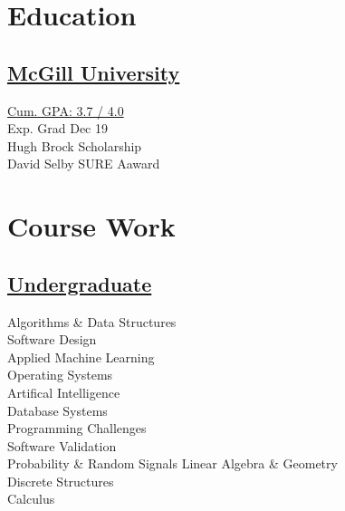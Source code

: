 \documentclass[]{allanwang-resume}
\begin{document}
\header

\begin{minipage}[t]{0.33\textwidth}



	\section{Education}
	\subsection{\href{http://www.abdullahsumbal.com/Doc/transcript.pdf}{McGill University}}
	\href{http://www.abdullahsumbal.com/Doc/transcript.pdf}{Cum. GPA: 3.7 / 4.0}\\
	Exp. Grad Dec 19 \\
	Hugh Brock Scholarship \\
	David Selby SURE Aaward
	\sectionsep

	\section{Course Work }
	\subsection{\href{http://www.abdullahsumbal.com/Doc/transcript.pdf}{Undergraduate}}
	Algorithms \& Data Structures \\
	Software Design \\
	Applied Machine Learning \\
	Operating Systems \\
	Artifical Intelligence \\
	Database Systems\\
	Programming Challenges \\
	Software Validation \\
	 Probability \& Random Signals
	Linear Algebra \& Geometry \\
	Discrete Structures \\
	Calculus \\
	\sectionsep


\end{minipage}
\end{document}
